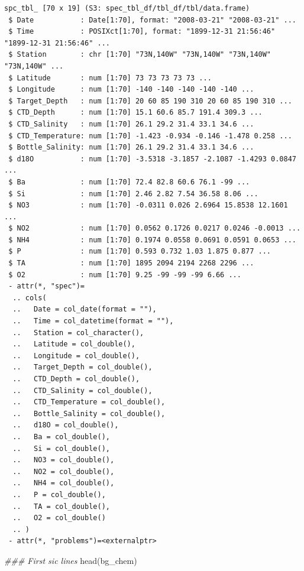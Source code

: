 \documentclass[
  letterpaper,
  DIV=11,
  numbers=noendperiod]{scrartcl}
\newenvironment{Shaded}{\begin{snugshade}}{\end{snugshade}}
\newcommand{\DocumentationTok}[1]{\textcolor[rgb]{0.37,0.37,0.37}{\textit{#1}}}
\newcommand{\FunctionTok}[1]{\textcolor[rgb]{0.28,0.35,0.67}{#1}}
\newcommand{\NormalTok}[1]{\textcolor[rgb]{0.00,0.23,0.31}{#1}}
\begin{document}
\begin{verbatim}
spc_tbl_ [70 x 19] (S3: spec_tbl_df/tbl_df/tbl/data.frame)
 $ Date           : Date[1:70], format: "2008-03-21" "2008-03-21" ...
 $ Time           : POSIXct[1:70], format: "1899-12-31 21:56:46" "1899-12-31 21:56:46" ...
 $ Station        : chr [1:70] "73N,140W" "73N,140W" "73N,140W" "73N,140W" ...
 $ Latitude       : num [1:70] 73 73 73 73 73 ...
 $ Longitude      : num [1:70] -140 -140 -140 -140 -140 ...
 $ Target_Depth   : num [1:70] 20 60 85 190 310 20 60 85 190 310 ...
 $ CTD_Depth      : num [1:70] 15.1 60.6 85.7 191.4 309.3 ...
 $ CTD_Salinity   : num [1:70] 26.1 29.2 31.4 33.1 34.6 ...
 $ CTD_Temperature: num [1:70] -1.423 -0.934 -0.146 -1.478 0.258 ...
 $ Bottle_Salinity: num [1:70] 26.1 29.2 31.4 33.1 34.6 ...
 $ d18O           : num [1:70] -3.5318 -3.1857 -2.1087 -1.4293 0.0847 ...
 $ Ba             : num [1:70] 72.4 82.8 60.6 76.1 -99 ...
 $ Si             : num [1:70] 2.46 2.82 7.54 36.58 8.06 ...
 $ NO3            : num [1:70] -0.0311 0.026 2.6964 15.8538 12.1601 ...
 $ NO2            : num [1:70] 0.0562 0.1726 0.0217 0.0246 -0.0013 ...
 $ NH4            : num [1:70] 0.1974 0.0558 0.0691 0.0591 0.0653 ...
 $ P              : num [1:70] 0.593 0.732 1.03 1.875 0.877 ...
 $ TA             : num [1:70] 1895 2094 2194 2268 2296 ...
 $ O2             : num [1:70] 9.25 -99 -99 -99 6.66 ...
 - attr(*, "spec")=
  .. cols(
  ..   Date = col_date(format = ""),
  ..   Time = col_datetime(format = ""),
  ..   Station = col_character(),
  ..   Latitude = col_double(),
  ..   Longitude = col_double(),
  ..   Target_Depth = col_double(),
  ..   CTD_Depth = col_double(),
  ..   CTD_Salinity = col_double(),
  ..   CTD_Temperature = col_double(),
  ..   Bottle_Salinity = col_double(),
  ..   d18O = col_double(),
  ..   Ba = col_double(),
  ..   Si = col_double(),
  ..   NO3 = col_double(),
  ..   NO2 = col_double(),
  ..   NH4 = col_double(),
  ..   P = col_double(),
  ..   TA = col_double(),
  ..   O2 = col_double()
  .. )
 - attr(*, "problems")=<externalptr> 
\end{verbatim}

\begin{Shaded}
\begin{Highlighting}[]
\DocumentationTok{\#\#\# First sic lines}
\FunctionTok{head}\NormalTok{(bg\_chem)}
\end{Highlighting}
\end{Shaded}
\end{document}
